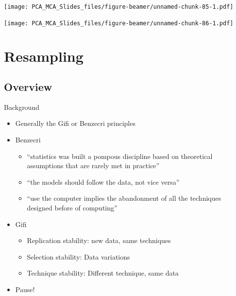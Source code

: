 \documentclass[
  ignorenonframetext,
]{beamer}
\providecommand{\tightlist}{%
  \setlength{\itemsep}{0pt}\setlength{\parskip}{0pt}}
\begin{document}
\begin{frame}

\texttt{[image: PCA\_MCA\_Slides\_files/figure-beamer/unnamed-chunk-85-1.pdf]}

\end{frame}

\begin{frame}

\texttt{[image: PCA\_MCA\_Slides\_files/figure-beamer/unnamed-chunk-86-1.pdf]}

\end{frame}

\hypertarget{resampling}{%
\section{Resampling}\label{resampling}}

\hypertarget{overview-1}{%
\subsection{Overview}\label{overview-1}}

\begin{frame}{Background}
\protect\hypertarget{background}{}

\begin{itemize}[<+->]
\tightlist
\item
  Generally the Gifi or Benzecri principles
\item
  Benzecri

  \begin{itemize}[<+->]
  \tightlist
  \item
    ``statistics was built a pompous discipline based on theoretical
    assumptions that are rarely met in practice''
  \item
    ``the models should follow the data, not vice versa''
  \item
    ``use the computer implies the abandonment of all the techniques
    designed before of computing''
  \end{itemize}
\item
  Gifi

  \begin{itemize}[<+->]
  \tightlist
  \item
    Replication stability: new data, same techniques
  \item
    Selection stability: Data variations
  \item
    Technique stability: Different technique, same data
  \end{itemize}
\item
  Pause!
\end{itemize}

\end{frame}
\end{document}
